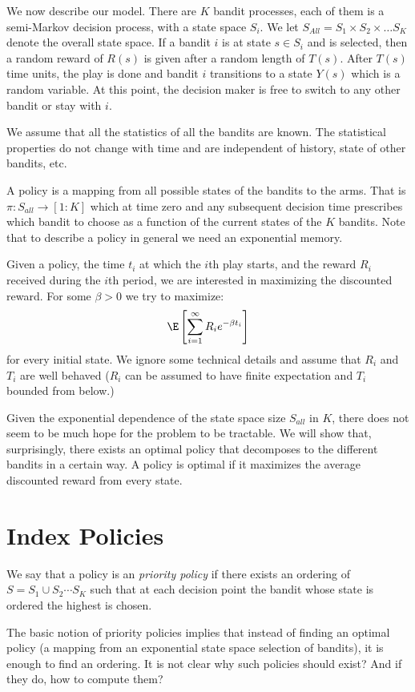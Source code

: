 We now describe our model.
There are $K$ bandit processes, each of them is a semi-Markov decision process, with a state space $S_i$.
We let $S_{All} = S_1 \times S_2 \times \ldots  S_K$ denote the overall state space.
If a bandit $i$ is at state $s\in S_i$ and is selected, then a random reward of $R(s)$ is given after a random length of $T(s)$. After $T(s)$ time units, the play is done and bandit $i$ transitions to a state $Y(s)$ which is a random variable.
At this point, the decision maker is free to switch to any other bandit or stay with $i$.

We assume that all the statistics of all the bandits are known. The statistical properties do not change with time and are independent of history, state of other bandits, etc.

A policy is a mapping from all possible states of the bandits to the arms. That is $\pi: S_{all} \to [1:K]$ which at time zero and any subsequent decision time prescribes which bandit to choose as a function of the current states of the $K$ bandits. Note that to describe a policy in general we need an exponential memory.

Given a policy, the time $t_i$ at which the $i$th play starts, and the reward $R_i$ received during the $i$th period, we are interested in maximizing the discounted reward. For some $\beta>0$ we try to maximize:
$$
\E \left[ \sum_{i=1}^\infty R_i e^{-\beta t_i} \right]
$$
for every initial state. We ignore some technical details and assume that $R_i$ and $T_i$ are well behaved ($R_i$ can be assumed to have finite expectation and $T_i$ bounded from below.)

Given the exponential dependence of the state space size $S_{all}$ in $K$, there does not seem to be much hope for the problem to be tractable. We will show that, surprisingly, there exists an optimal policy that decomposes to the different bandits in a certain way.
A policy is optimal if it maximizes the average discounted reward from every state.



\section{Index Policies}

We say that a policy is an {\em priority policy } if there exists an ordering of $S = S_1 \cup S_2 \cdots S_K$ such that at each decision point the bandit whose state is ordered the highest is chosen.

The basic notion of priority policies implies that instead of finding an optimal policy (a mapping from an exponential state space selection of bandits), it is enough to find an ordering. It is not clear why such policies should exist? And if they do, how to compute them?

